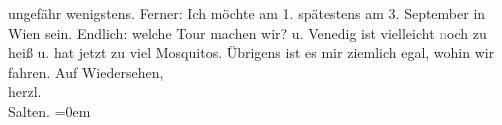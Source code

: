 \begin{ledgroupsized}[t]{13cm}
               ungefähr wenigstens. Ferner: Ich möchte am 1.
               spätestens am 3. September in Wien sein. Endlich: welche Tour machen wir? \label{K_L03312-2v}\label{K_L03312-2h} u. Venedig ist vielleicht
                  \textcolor{gray}{n}och zu heiß u. hat jetzt zu viel Mosquitos. Übrigens ist es
               mir ziemlich egal, wohin wir fahren.\pend
           \pstart
           Auf Wiedersehen, {\\[\baselineskip]}herzl. {\\[\baselineskip]}\spacefill\mbox{Salten.}\pend
           \leftskip=0em{}
         
         \endnumbering{}\end{ledgroupsized}  \newcommand{\dateiname}{L03312}\newcommand{\titel}{Felix Salten an Arthur Schnitzler, 20. 8. 1900}\newcommand{\editorInnen}{Martin Anton Müller und Laura Untner}
      